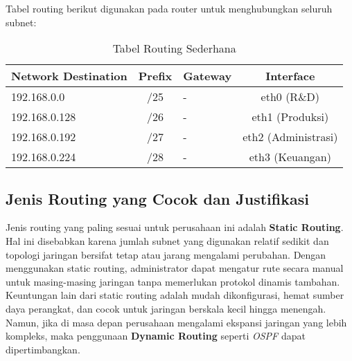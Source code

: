 Tabel routing berikut digunakan pada router untuk menghubungkan seluruh subnet:

\begin{table}[H]
\centering
\caption{Tabel Routing Sederhana}
\begin{tabular}{|l|c|l|c|}
\hline
\textbf{Network Destination} & \textbf{Prefix} & \textbf{Gateway} & \textbf{Interface} \\
\hline
192.168.0.0 & /25 & - & eth0 (R\&D) \\
192.168.0.128 & /26 & - & eth1 (Produksi) \\
192.168.0.192 & /27 & - & eth2 (Administrasi) \\
192.168.0.224 & /28 & - & eth3 (Keuangan) \\
\hline
\end{tabular}
\end{table}

\subsection{Jenis Routing yang Cocok dan Justifikasi}
Jenis routing yang paling sesuai untuk perusahaan ini adalah \textbf{Static Routing}. Hal ini disebabkan karena jumlah subnet yang digunakan relatif sedikit dan topologi jaringan bersifat tetap atau jarang mengalami perubahan. Dengan menggunakan static routing, administrator dapat mengatur rute secara manual untuk masing-masing jaringan tanpa memerlukan protokol dinamis tambahan. Keuntungan lain dari static routing adalah mudah dikonfigurasi, hemat sumber daya perangkat, dan cocok untuk jaringan berskala kecil hingga menengah. Namun, jika di masa depan perusahaan mengalami ekspansi jaringan yang lebih kompleks, maka penggunaan \textbf{Dynamic Routing} seperti \textit{OSPF} dapat dipertimbangkan.
